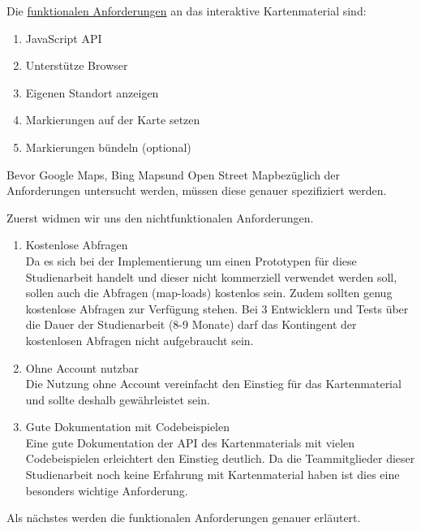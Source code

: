 Die \underline{funktionalen Anforderungen} an das interaktive Kartenmaterial sind:
\begin{enumerate}
\item JavaScript API
\item Unterstütze Browser
\item Eigenen Standort anzeigen
\item Markierungen auf der Karte setzen
\item Markierungen bündeln (optional)
\end{enumerate}

Bevor \glqq Google Maps\grqq, \glqq Bing Maps\grqq  und \glqq Open Street Map\grqq  bezüglich der Anforderungen untersucht werden, müssen diese genauer spezifiziert werden.

Zuerst widmen wir uns den nichtfunktionalen Anforderungen.
\begin{enumerate}
\item Kostenlose Abfragen \\
Da es sich bei der Implementierung um einen Prototypen für diese Studienarbeit handelt und dieser nicht kommerziell verwendet werden soll, sollen auch die Abfragen (map-loads) kostenlos sein. Zudem sollten genug kostenlose Abfragen zur Verfügung stehen. Bei 3 Entwicklern und Tests über die Dauer der Studienarbeit (8-9 Monate) darf das Kontingent der kostenlosen Abfragen nicht aufgebraucht sein.

\item Ohne Account nutzbar\\
Die Nutzung ohne Account vereinfacht den Einstieg für das Kartenmaterial und sollte deshalb gewährleistet sein. 

\item Gute Dokumentation mit Codebeispielen\\
Eine gute Dokumentation der API des Kartenmaterials mit vielen Codebeispielen erleichtert den Einstieg deutlich. Da die Teammitglieder dieser Studienarbeit noch keine Erfahrung mit Kartenmaterial haben ist dies eine besonders wichtige Anforderung. 


\end{enumerate}



Als nächstes werden die funktionalen Anforderungen genauer erläutert.

